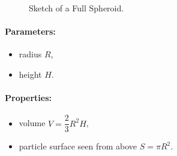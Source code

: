 \begin{figure}[ht]
\hfill
{}
\hfill
{}
\hfill
\caption{Sketch of a Full Spheroid. }
\label{fig:fullspheroid}
\end{figure}

\FloatBarrier

\paragraph{Parameters:}
\begin{itemize}
\item radius $R$,
\item height $H$.
\end{itemize}

\paragraph{Properties:}
\begin{itemize}
\item volume $V =\dfrac{2}{3}R^2H$,
\item particle surface seen from above $S =\pi R^2$. 
\end{itemize}

